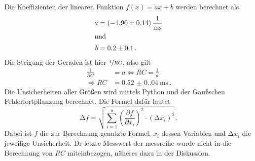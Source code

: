 Die Koeffizienten der linearen Funktion $f(x)=ax+b$ werden berechnet als
\begin{align*}
    a&=\qty{-1.9(0.14)}{\per\milli\second}\\
    \intertext{und}
    b&=0.2\pm0.1\,.
\end{align*}
Die Steigung der Geraden ist hier $\sfrac{1}{RC}$, also gilt
\begin{align*}
    \frac{1}{RC}&=a\Leftrightarrow RC=\frac{1}{a}\\
    \Rightarrow RC&=\qty{0.52(0.04)}{\milli\second}\,.
\end{align*}
Die Unsicherheiten aller Größen wird mittels Python und der Gaußschen 
Fehlerfortpflanzung berechnet. Die Formel dafür lautet
\begin{equation}
    \increment f= \sqrt{\sum_{i=1}^n\left(\frac{\partial f}{\partial x_i}
    \right)^2\cdot (\increment x_i)^2}\,.
    \end{equation}
Dabei ist $f$ die zur Berechnung genutzte Formel, $x_i$ dessen
Variablen und $\increment x_i$ die jeweilige Unsicherheit.
Dr letzte Messwert der messreihe wurde nicht in die Berechnung von $RC$ miteinbezogen,
näheres dazu in der Diskussion.
